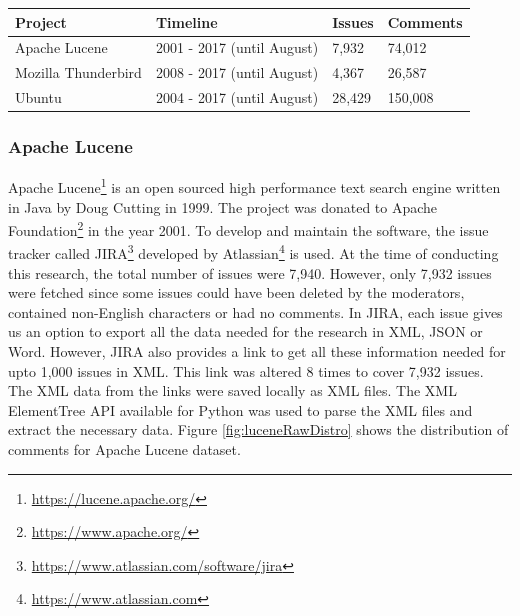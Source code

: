 \documentclass[a4paper,12pt,twoside]{report}
\begin{document}
\begin{table} %
    \centering
    \begin{adjustbox}{max width=\columnwidth}
    \def\arraystretch{1} %
    \begin{tabular}{p{4cm} p{5cm} p{2cm} p{3cm}}
        \toprule
        \textbf{Project} & \textbf{Timeline} & \textbf{Issues} & \textbf{Comments}\\
        \midrule
			Apache Lucene & 2001 - 2017 (until August) & 7,932 & 74,012\\
			Mozilla Thunderbird & 2008 - 2017 (until August) & 4,367 & 26,587\\ 
			Ubuntu & 2004 - 2017 (until August) & 28,429 & 150,008\\
        \midrule
    \end{tabular}
    \end{adjustbox}
    \label{tab:rawIssueTrackers}
\end{table}

\subsubsection{Apache Lucene}
Apache Lucene\footnote{\url{https://lucene.apache.org/}} is an open sourced high performance text search engine written in Java by Doug Cutting in 1999. The project was donated to Apache Foundation\footnote{\url{https://www.apache.org/}} in the year 2001. To develop and maintain the software, the issue tracker called JIRA\footnote{\url{https://www.atlassian.com/software/jira}} developed by Atlassian\footnote{\url{https://www.atlassian.com}} is used. At the time of conducting this research, the total number of issues were 7,940. However, only 7,932 issues were fetched since some issues could have been deleted by the moderators, contained non-English characters or had no comments.
\bigbreak
In JIRA, each issue gives us an option to export all the data needed for the research in XML, JSON or Word. However, JIRA also provides a link to get all these information needed for upto 1,000 issues in XML. This link was altered 8 times to cover 7,932 issues. The XML data from the links were saved locally as XML files. The XML ElementTree API available for Python was used to parse the XML files and extract the necessary data. Figure \ref{fig:luceneRawDistro} shows the distribution of comments for Apache Lucene dataset. 
\end{document}
